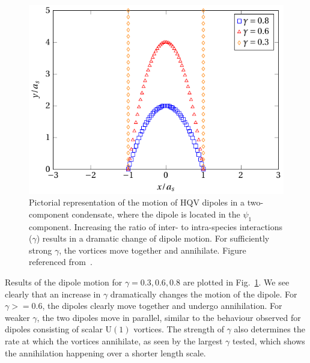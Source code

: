 \begin{figure}
    \centering
    \includegraphics{gfx/ch-twoCompDynamics/HQV-dipole-dynamics.pdf}
    \caption[Schematic representation of dipole motion for various \(\gamma \)]
    {\label{fig: HQV-dipole-motion}Pictorial representation of the
        motion of HQV dipoles in a two-component condensate, where the dipole is
        located in the \(\psi_1\) component.
        Increasing the ratio of inter- to intra-species interactions
        (\(\gamma \)) results in a dramatic change of dipole motion.
        For sufficiently strong \(\gamma \), the vortices move together and
        annihilate.
        Figure referenced from~\cite{Kasamatsu2016}.}
\end{figure}
Results of the dipole motion for \(\gamma=0.3, 0.6, 0.8\) are plotted in
Fig.~\ref{fig: HQV-dipole-motion}.
We see clearly that an increase in \(\gamma \) dramatically changes the motion
of the dipole.
For \(\gamma>=0.6\), the dipoles clearly move together and undergo annihilation.
For weaker \(\gamma \), the two dipoles move in parallel, similar to
the behaviour observed for dipoles consisting of scalar \(\mathrm{U}(1)\)
vortices.
The strength of \(\gamma \) also determines the rate at which the vortices
annihilate, as seen by the largest \(\gamma \) tested, which shows the
annihilation happening over a shorter length scale.


